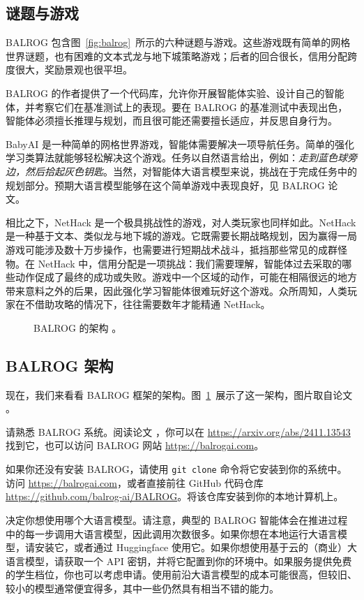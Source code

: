 \subsection{谜题与游戏}
BALROG 包含图~\ref{fig:balrog}~所示的六种谜题与游戏。这些游戏既有简单的网格世界谜题，也有困难的文本式龙与地下城策略游戏；后者的回合很长，信用分配跨度很大，奖励景观也很平坦。

BALROG 的作者提供了一个代码库，允许你开展智能体实验、设计自己的智能体，并考察它们在基准测试上的表现。要在 BALROG 的基准测试中表现出色，智能体必须擅长推理与规划，而且很可能还需要擅长适应，并反思自身行为。

BabyAI 是一种简单的网格世界游戏，智能体需要解决一项导航任务。简单的强化学习类算法就能够轻松解决这个游戏。任务以自然语言给出，例如：{\em 走到蓝色球旁边，然后拾起灰色钥匙}。当然，对智能体大语言模型来说，挑战在于完成任务中的规划部分。预期大语言模型能够在这个简单游戏中表现良好，见 BALROG 论文。

相比之下，NetHack 是一个极具挑战性的游戏，对人类玩家也同样如此。NetHack 是一种基于文本、类似龙与地下城的游戏。它既需要长期战略规划，因为赢得一局游戏可能涉及数十万步操作，也需要进行短期战术战斗，抵挡那些常见的成群怪物。在 NetHack 中，信用分配是一项挑战：我们需要理解，智能体过去采取的哪些动作促成了最终的成功或失败。游戏中一个区域的动作，可能在相隔很远的地方带来意料之外的后果，因此强化学习智能体很难玩好这个游戏。众所周知，人类玩家在不借助攻略的情况下，往往需要数年才能精通 NetHack。

\begin{figure}
    \centering
    
    \caption{BALROG 的架构 \citep{paglieri2024balrog}。}
    \label{fig:balrogarch}
\end{figure}

\subsection{BALROG 架构}
现在，我们来看看 BALROG 框架的架构。图~\ref{fig:balrogarch}~展示了这一架构，图片取自论文 \citep{paglieri2024balrog}。

请熟悉 BALROG 系统。阅读论文 \citet{paglieri2024balrog}，你可以在 \url{https://arxiv.org/abs/2411.13543} 找到它，也可以访问 BALROG 网站 \url{https://balrogai.com}。

如果你还没有安装 BALROG，请使用 \verb|git clone| 命令将它安装到你的系统中。
访问 \url{https://balrogai.com}，或者直接前往 GitHub 代码仓库 \url{https://github.com/balrog-ai/BALROG}。将该仓库安装到你的本地计算机上。

决定你想使用哪个大语言模型。请注意，典型的 BALROG 智能体会在推进过程中的每一步调用大语言模型，因此调用次数很多。如果你想在本地运行大语言模型，请安装它，或者通过 Huggingface 使用它。如果你想使用基于云的（商业）大语言模型，请获取一个 API 密钥，并将它配置到你的环境中。如果服务提供免费的学生档位，你也可以考虑申请。使用前沿大语言模型的成本可能很高，但较旧、较小的模型通常便宜得多，其中一些仍然具有相当不错的能力。


